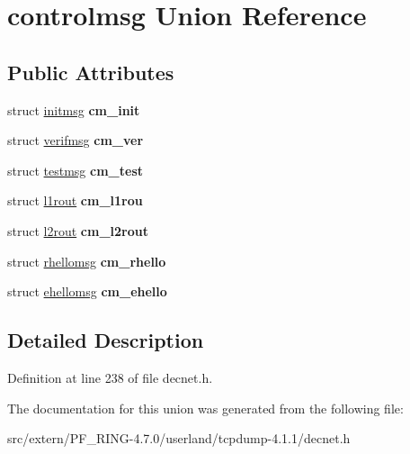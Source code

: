 \hypertarget{unioncontrolmsg}{
\section{controlmsg Union Reference}
\label{unioncontrolmsg}
}
\subsection*{Public Attributes}
\begin{DoxyCompactItemize}
\item 
\hypertarget{unioncontrolmsg_addd1decdb41d81127cf5a7e86ca8c07b}{
struct \hyperlink{structinitmsg}{initmsg} {\bfseries cm\_\-init}}
\label{unioncontrolmsg_addd1decdb41d81127cf5a7e86ca8c07b}

\item 
\hypertarget{unioncontrolmsg_a59c88fa1120dc1860b4d30aacaf45d9e}{
struct \hyperlink{structverifmsg}{verifmsg} {\bfseries cm\_\-ver}}
\label{unioncontrolmsg_a59c88fa1120dc1860b4d30aacaf45d9e}

\item 
\hypertarget{unioncontrolmsg_a1e5c0409a73c8a8208f6f64c9b980287}{
struct \hyperlink{structtestmsg}{testmsg} {\bfseries cm\_\-test}}
\label{unioncontrolmsg_a1e5c0409a73c8a8208f6f64c9b980287}

\item 
\hypertarget{unioncontrolmsg_a596821402157c80e82879ee3463d801e}{
struct \hyperlink{structl1rout}{l1rout} {\bfseries cm\_\-l1rou}}
\label{unioncontrolmsg_a596821402157c80e82879ee3463d801e}

\item 
\hypertarget{unioncontrolmsg_a0ef67a61b2d5231135189e1047548768}{
struct \hyperlink{structl2rout}{l2rout} {\bfseries cm\_\-l2rout}}
\label{unioncontrolmsg_a0ef67a61b2d5231135189e1047548768}

\item 
\hypertarget{unioncontrolmsg_a8e569d20cdc44368ac59491b1f26b1db}{
struct \hyperlink{structrhellomsg}{rhellomsg} {\bfseries cm\_\-rhello}}
\label{unioncontrolmsg_a8e569d20cdc44368ac59491b1f26b1db}

\item 
\hypertarget{unioncontrolmsg_a70e35c6031a235a6687eda2d4c64b4e9}{
struct \hyperlink{structehellomsg}{ehellomsg} {\bfseries cm\_\-ehello}}
\label{unioncontrolmsg_a70e35c6031a235a6687eda2d4c64b4e9}

\end{DoxyCompactItemize}


\subsection{Detailed Description}


Definition at line 238 of file decnet.h.



The documentation for this union was generated from the following file:\begin{DoxyCompactItemize}
\item 
src/extern/PF\_\-RING-\/4.7.0/userland/tcpdump-\/4.1.1/decnet.h\end{DoxyCompactItemize}
